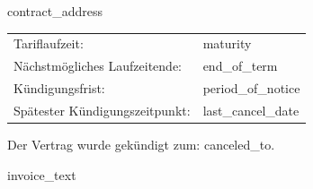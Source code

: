 \documentclass[version=last, fontsize=10pt, fromlogo=true, refline=wide, fromaddress=false, enlargefirstpage=true, numericaldate=true]{scrlttr2}
\begin{document}
\begin{letter}{{contract\_address}}
		\begin{flushleft}
			{}
			{
				{
						\begin{tabular} {@{}ll}
							Tariflaufzeit: & {maturity}\\
							Nächstmögliches Laufzeitende: & {end\_of\_term}\\
							Kündigungsfrist: & {period\_of\_notice}\\
							Spätester Kündigungszeitpunkt: & {last\_cancel\_date}\\
						\end{tabular}
				} { %
					Der Vertrag wurde gekündigt zum: {canceled\_to}.
				}
			}
		\end{flushleft}

		\begin{flushleft}
			{invoice\_text}
		\end{flushleft}

	\end{letter}
\end{document}
